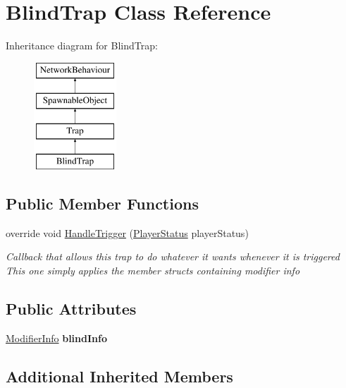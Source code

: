\hypertarget{class_blind_trap}{}\section{Blind\+Trap Class Reference}
\label{class_blind_trap}
Inheritance diagram for Blind\+Trap\+:\begin{figure}[H]
\begin{center}
\leavevmode
\includegraphics[height=4.000000cm]{class_blind_trap}
\end{center}
\end{figure}
\subsection*{Public Member Functions}
\begin{DoxyCompactItemize}
\item 
override void \hyperlink{class_blind_trap_ac4e3be7b712921ae6510aca3be3ef428}{Handle\+Trigger} (\hyperlink{class_player_status}{Player\+Status} player\+Status)
\begin{DoxyCompactList}\small\item\em Callback that allows this trap to do whatever it wants whenever it is triggered This one simply applies the member structs containing modifier info \end{DoxyCompactList}\end{DoxyCompactItemize}
\subsection*{Public Attributes}
\begin{DoxyCompactItemize}
\item 
\hypertarget{class_blind_trap_abd516b655ac7118729a733e212cf5609}{}\label{class_blind_trap_abd516b655ac7118729a733e212cf5609} 
\hyperlink{struct_modifier_info}{Modifier\+Info} {\bfseries blind\+Info}
\end{DoxyCompactItemize}
\subsection*{Additional Inherited Members}


